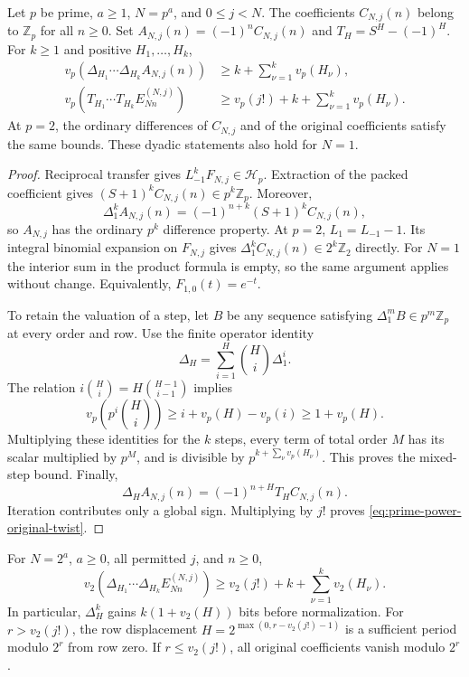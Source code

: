 \begin{theorem}
\label{thm:all-prime-power-transfer}
Let $p$ be prime, $a\geq1$, $N=p^a$, and $0\leq j<N$.
The coefficients $C_{N,j}(n)$ belong to $\mathbb Z_p$ for all $n\geq0$.
Set $A_{N,j}(n)=(-1)^n C_{N,j}(n)$ and
$T_H=S^H-(-1)^H$. For $k\geq1$ and positive $H_1,\ldots,H_k$,
\begin{align}
 v_p(\Delta_{H_1}\cdots\Delta_{H_k}A_{N,j}(n))
  &\geq k+\sum_{\nu=1}^k v_p(H_\nu),
 \label{eq:prime-power-signed-bound}\\
 v_p(T_{H_1}\cdots T_{H_k}E_{Nn}^{(N,j)})
  &\geq v_p(j!)+k+\sum_{\nu=1}^k v_p(H_\nu).
 \label{eq:prime-power-original-twist}
\end{align}
At $p=2$, the ordinary differences of $C_{N,j}$ and of the original
coefficients satisfy the same bounds. These dyadic statements also hold
for $N=1$.
\end{theorem}

\begin{proof}
Reciprocal transfer gives $L_{-1}^kF_{N,j}\in\mathcal H_p$.
Extraction of the packed coefficient gives
$(S+1)^k C_{N,j}(n)\in p^k\mathbb Z_p$. Moreover,
\[
 \Delta_1^k A_{N,j}(n)=(-1)^{n+k}(S+1)^k C_{N,j}(n),
\]
so $A_{N,j}$ has the ordinary $p^k$ difference property.
At $p=2$, $L_1=L_{-1}-1$. Its integral binomial expansion on
$F_{N,j}$ gives $\Delta_1^k C_{N,j}(n)\in2^k\mathbb Z_2$ directly.
For $N=1$ the interior sum in the product formula is empty, so the same
argument applies without change. Equivalently, $F_{1,0}(t)=e^{-t}$.

To retain the valuation of a step, let $B$ be any sequence satisfying
$\Delta_1^m B\in p^m\mathbb Z_p$ at every order and row. Use the finite
operator identity
\[
 \Delta_H=\sum_{i=1}^H\binom Hi\Delta_1^i.
\]
The relation $i\binom Hi=H\binom{H-1}{i-1}$ implies
\[
 v_p\left(p^i\binom Hi\right)
 \geq i+v_p(H)-v_p(i)\geq1+v_p(H).
\]
Multiplying these identities for the $k$ steps, every term of total
order $M$ has its scalar multiplied by $p^M$, and is divisible by
$p^{k+\sum_\nu v_p(H_\nu)}$. This proves the mixed-step bound.
Finally,
\[
 \Delta_H A_{N,j}(n)=(-1)^{n+H}T_H C_{N,j}(n).
\]
Iteration contributes only a global sign. Multiplying by $j!$ proves
\eqref{eq:prime-power-original-twist}.
\end{proof}

\begin{corollary}
\label{cor:all-dyadic-final}
For $N=2^a$, $a\geq0$, all permitted $j$, and $n\geq0$,
\begin{equation}
 v_2(\Delta_{H_1}\cdots\Delta_{H_k}E_{Nn}^{(N,j)})
  \geq v_2(j!)+k+\sum_{\nu=1}^k v_2(H_\nu).
 \label{eq:all-dyadic-final-bound}
\end{equation}
In particular, $\Delta_H^k$ gains $k(1+v_2(H))$ bits before normalization.
For $r>v_2(j!)$, the row displacement
$H=2^{\max(0,r-v_2(j!)-1)}$ is a sufficient period modulo $2^r$ from
row zero. If $r\leq v_2(j!)$, all original coefficients vanish modulo
$2^r$.
\end{corollary}

